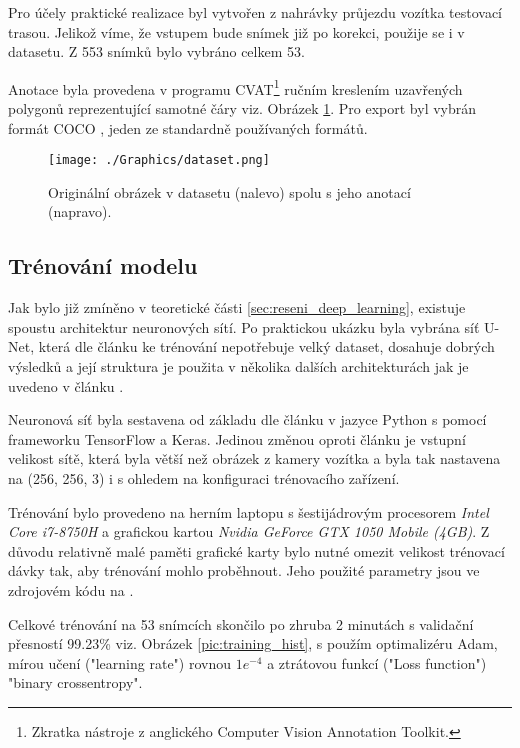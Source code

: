 \documentclass[czech, bc, kky, he, iso690numb]{fasthesis}
\begin{document}
        		Pro účely praktické realizace byl vytvořen z nahrávky průjezdu vozítka testovací trasou. Jelikož víme, že vstupem bude snímek již po korekci, použije se i v datasetu. Z 553 snímků bylo vybráno celkem 53.
        		
        		Anotace byla provedena v programu CVAT\footnote{Zkratka nástroje z anglického Computer Vision Annotation Toolkit.} ručním kreslením uzavřených polygonů reprezentující samotné čáry viz. Obrázek \ref{pic:anotace}. Pro export byl vybrán formát COCO \cite{COCO_format}, jeden ze standardně používaných formátů.
        			
        			\begin{figure}[h]
        				\centering
        				\texttt{[image: ./Graphics/dataset.png]}
        				\caption{Originální obrázek v datasetu (nalevo) spolu s jeho anotací (napravo).}
        				\label{pic:anotace}
        			\end{figure}
        	\subsection{Trénování modelu}
        		Jak bylo již zmíněno v teoretické části \ref{sec:reseni_deep_learning}, existuje spoustu architektur neuronových sítí. Po praktickou ukázku byla vybrána síť U-Net, která dle článku \cite{U-Net} ke trénování nepotřebuje velký dataset, dosahuje dobrých výsledků a její struktura je použita v několika dalších architekturách jak je uvedeno v článku \cite{semantic_segmentation_survey}.
        		
        		Neuronová síť byla sestavena od základu dle článku \cite{U-Net} v jazyce Python s pomocí frameworku TensorFlow a Keras. Jedinou změnou oproti článku je vstupní velikost sítě, která byla větší než obrázek z kamery vozítka a byla tak nastavena na (256, 256, 3) i s ohledem na konfiguraci trénovacího zařízení.
        		 
        		Trénování bylo provedeno na herním laptopu s šestijádrovým procesorem \textit{Intel Core i7-8750H} a grafickou kartou \textit{Nvidia GeForce GTX 1050 Mobile (4GB)}. Z důvodu relativně malé paměti grafické karty bylo nutné omezit velikost trénovací dávky tak, aby trénování mohlo proběhnout. Jeho použité parametry jsou ve zdrojovém kódu na \cite{github_repo}. 
        		
        		Celkové trénování na 53 snímcích skončilo po zhruba 2 minutách s validační přesností 99.23\% viz. Obrázek \ref{pic:training_hist}, s použím optimalizéru Adam, mírou učení ("learning rate") rovnou \(1e^{-4}\) a ztrátovou funkcí ("Loss function") "binary crossentropy".
        		
\end{document}
